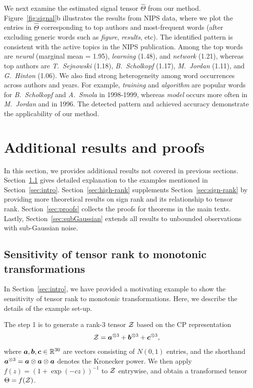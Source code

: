 \documentclass[11pt]{article}
\theoremstyle{plain}
\theoremstyle{definition}
\begin{document}
We next examine the estimated signal tensor $\hat \Theta$ from our method.  Figure~\ref{fig:signal}b illustrates the results from NIPS data, where we plot the entries in $\hat \Theta$ corresponding to top authors and most-frequent words (after excluding generic words such as \emph{figure}, \emph{results}, etc). The identified pattern is consistent with the active topics in the NIPS publication. Among the top words are \emph{neural} (marginal mean = 1.95), \emph{learning} (1.48), and \emph{network} (1.21), whereas top authors are \emph{T.\ Sejnowski} (1.18), \emph{B.~Scholkopf} (1.17), \emph{M.\ Jordan} (1.11), and \emph{G.\ Hinton} (1.06). We also find strong heterogeneity among word occurrences across authors and years. For example, \emph{training} and \emph{algorithm} are popular words for \emph{B.\ Scholkopf} and \emph{A.\ Smola} in 1998-1999, whereas \emph{model} occurs more often in \emph{M.\ Jordan} and in 1996. The detected pattern and achieved accuracy demonstrate the applicability of our method.



\section{Additional results and proofs}
In this section, we provides additional results not covered in previous sections. Section~\ref{sec:additional} gives detailed explanation to the examples mentioned in Section~\ref{sec:intro}. Section~\ref{sec:high-rank} supplements Section~\ref{sec:sign-rank} by providing more theoretical results on sign rank and its relationship to tensor rank. Section~\ref{sec:proofs} collects the proofs for theorems in the main texts.  Lastly,  Section~\ref{sec:subGaussian} extends all  results to unbounded observations with sub-Gaussian noise.


\subsection{Sensitivity of tensor rank to monotonic transformations}\label{sec:additional}
In Section~\ref{sec:intro}, we have provided a motivating example to show the sensitivity of tensor rank to monotonic transformations. Here, we describe the details of the example set-up. 

The step 1 is to generate a rank-3 tensor $\mathcal{Z}$ based on the CP representation
\[
\mathcal{Z}=\bm{a}^{\otimes 3}+\bm{b}^{\otimes 3}+\bm{c}^{\otimes 3},
\]
where $\bm{a},\bm{b},\bm{c}\in\mathbb{R}^{30}$ are vectors consisting of $N(0,1)$ entries, and the shorthand $\bm{a}^{\otimes 3}=\bm{a}\otimes \bm{a}\otimes \bm{a}$ denotes the Kronecker power. We then apply $f(z)=(1+\exp(-cz))^{-1}$ to $\mathcal{Z}$ entrywise, and obtain a transformed tensor $\Theta=f(\mathcal{Z})$. 
\end{document}
